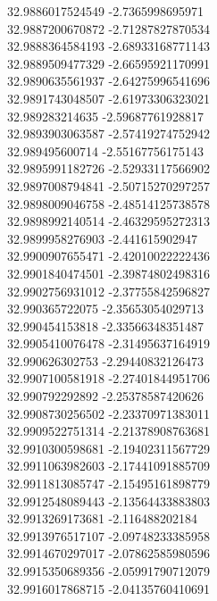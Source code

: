 {32.9886017524549	-2.7365998695971\\
32.9887200670872	-2.71287827870534\\
32.9888364584193	-2.68933168771143\\
32.9889509477329	-2.66595921170991\\
32.9890635561937	-2.64275996541696\\
32.9891743048507	-2.61973306323021\\
32.989283214635	-2.59687761928817\\
32.9893903063587	-2.57419274752942\\
32.989495600714	-2.55167756175143\\
32.9895991182726	-2.52933117566902\\
32.9897008794841	-2.50715270297257\\
32.9898009046758	-2.48514125738578\\
32.9898992140514	-2.46329595272313\\
32.9899958276903	-2.441615902947\\
32.9900907655471	-2.42010022222436\\
32.9901840474501	-2.39874802498316\\
32.9902756931012	-2.37755842596827\\
32.990365722075	-2.35653054029713\\
32.990454153818	-2.33566348351487\\
32.9905410076478	-2.31495637164919\\
32.990626302753	-2.29440832126473\\
32.9907100581918	-2.27401844951706\\
32.990792292892	-2.25378587420626\\
32.9908730256502	-2.23370971383011\\
32.9909522751314	-2.21378908763681\\
32.9910300598681	-2.19402311567729\\
32.9911063982603	-2.17441091885709\\
32.9911813085747	-2.15495161898779\\
32.9912548089443	-2.13564433883803\\
32.9913269173681	-2.116488202184\\
32.9913976517107	-2.09748233385958\\
32.9914670297017	-2.07862585980596\\
32.9915350689356	-2.05991790712079\\
32.9916017868715	-2.04135760410691\\
}
